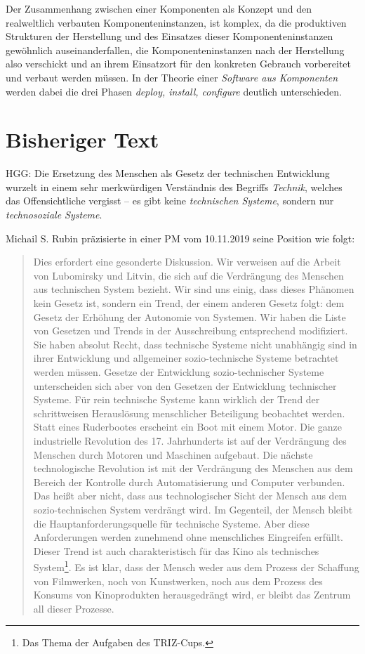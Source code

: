 \documentclass[11pt,a4paper]{article}
\begin{document}
Der Zusammenhang zwischen einer Komponenten als Konzept und den realweltlich
verbauten Komponenteninstanzen, ist komplex, da die produktiven Strukturen der
Herstellung und des Einsatzes dieser Komponenteninstanzen gewöhnlich
auseinanderfallen, die Komponenteninstanzen nach der Herstellung also
verschickt und an ihrem Einsatzort für den konkreten Gebrauch vorbereitet und
verbaut werden müssen. In der Theorie einer \emph{Software aus Komponenten}
werden dabei die drei Phasen \emph{deploy, install, configure} deutlich
unterschieden.

\section{Bisheriger Text}

HGG: Die Ersetzung des Menschen als Gesetz der technischen Entwicklung wurzelt
in einem sehr merkwürdigen Verständnis des Begriffs \emph{Technik}, welches
das Offensichtliche vergisst -- es gibt keine \emph{technischen Systeme},
sondern nur \emph{technosoziale Systeme}.

Michail S. Rubin präzisierte in einer PM vom 10.11.2019 seine Position wie
folgt:
\begin{quote}
  Dies erfordert eine gesonderte Diskussion. Wir verweisen auf die Arbeit von
  Lubomirsky und Litvin, die sich auf die Verdrängung des Menschen aus
  technischen System bezieht.  Wir sind uns einig, dass dieses Phänomen kein
  Gesetz ist, sondern ein Trend, der einem anderen Gesetz folgt: dem Gesetz
  der Erhöhung der Autonomie von Systemen.  Wir haben die Liste von Gesetzen
  und Trends in der Ausschreibung entsprechend modifiziert. Sie haben absolut
  Recht, dass technische Systeme nicht unabhängig sind in ihrer Entwicklung
  und allgemeiner sozio-technische Systeme betrachtet werden müssen. Gesetze
  der Entwicklung sozio-technischer Systeme unterscheiden sich aber von den
  Gesetzen der Entwicklung technischer Systeme. Für rein technische Systeme
  kann wirklich der Trend der schrittweisen Herauslösung menschlicher
  Beteiligung beobachtet werden. Statt eines Ruderbootes erscheint ein Boot
  mit einem Motor. Die ganze industrielle Revolution des 17. Jahrhunderts ist
  auf der Verdrängung des Menschen durch Motoren und Maschinen aufgebaut. Die
  nächste technologische Revolution ist mit der Verdrängung des Menschen aus
  dem Bereich der Kontrolle durch Automatisierung und Computer verbunden. Das
  heißt aber nicht, dass aus technologischer Sicht der Mensch aus dem
  sozio-technischen System verdrängt wird. Im Gegenteil, der Mensch bleibt die
  Hauptanforderungsquelle für technische Systeme. Aber diese Anforderungen
  werden zunehmend ohne menschliches Eingreifen erfüllt. Dieser Trend ist auch
  charakteristisch für das Kino als technisches System\footnote{Das Thema der
    Aufgaben des TRIZ-Cups.}. Es ist klar, dass der Mensch weder aus dem
  Prozess der Schaffung von Filmwerken, noch von Kunstwerken, noch aus dem
  Prozess des Konsums von Kinoprodukten herausgedrängt wird, er bleibt das
  Zentrum all dieser Prozesse.
\end{quote}
\end{document}
